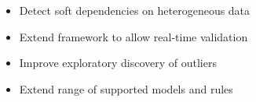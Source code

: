 \begin{block}{}
\vspace{-1cm}
\begin{itemize}
\item Detect soft dependencies on heterogeneous data
\item Extend framework to allow real-time validation%
\item Improve exploratory discovery of outliers 
\item Extend range of supported models and rules
\end{itemize}
\vspace{-0.5cm}
\end{block}
